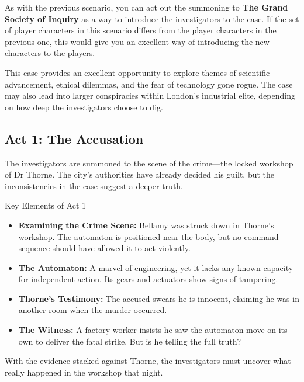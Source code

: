 \begin{GmTips}
    As with the previous scenario, you can act out the summoning to \textbf{The Grand Society of Inquiry} as a way to introduce the investigators to the case. If the set of player characters in this scenario differs from the player characters in the previous one, this would give you an excellent way of introducing the new characters to the players.
\end{GmTips}

\begin{GmTips}
    This case provides an excellent opportunity to explore themes of scientific advancement, ethical dilemmas, and the fear of technology gone rogue. The case may also lead into larger conspiracies within London's industrial elite, depending on how deep the investigators choose to dig.
\end{GmTips}

\subsection{Act 1: The Accusation}  
The investigators are summoned to the scene of the crime—the locked workshop of Dr Thorne. The city’s authorities have already decided his guilt, but the inconsistencies in the case suggest a deeper truth.

\begin{Example}{Key Elements of Act 1}
    \begin{itemize}\raggedright
        \item \textbf{Examining the Crime Scene:} Bellamy was struck down in Thorne’s workshop. The automaton is positioned near the body, but no command sequence should have allowed it to act violently.
        \item \textbf{The Automaton:} A marvel of engineering, yet it lacks any known capacity for independent action. Its gears and actuators show signs of tampering.
        \item \textbf{Thorne’s Testimony:} The accused swears he is innocent, claiming he was in another room when the murder occurred.
        \item \textbf{The Witness:} A factory worker insists he saw the automaton move on its own to deliver the fatal strike. But is he telling the full truth?
    \end{itemize}
\end{Example}

\noindent
With the evidence stacked against Thorne, the investigators must uncover what really happened in the workshop that night.

